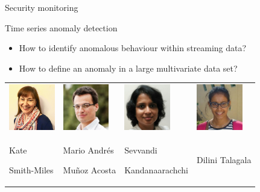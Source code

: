 \documentclass[14pt]{beamer}
\begin{document}
\begin{frame}{Security monitoring}


\vspace*{4.2cm}

\hspace*{5.3cm}


\end{frame}

\begin{frame}{Time series anomaly detection}

\begin{itemize}
\item
  How to identify anomalous behaviour within streaming data?
\item
  How to define an anomaly in a large multivariate data set?
\end{itemize}

\pause\vspace*{1.4cm}

\begin{block}{}
\fontsize{11}{11}\sf
\centering\begin{tabular}{p{2.3cm}p{2.3cm}p{2.3cm}p{2.3cm}}
\includegraphics[height=2cm]{figs/kate} &
\includegraphics[height=2cm]{figs/andres} &
\includegraphics[height=2cm]{figs/sevvandi} &
\includegraphics[height=2cm]{figs/dilini} \\
Kate\par Smith-Miles &
Mario Andrés\par Muñoz Acosta &
Sevvandi\par Kandanaarachchi & Dilini Talagala
\end{tabular}
\end{block}

\end{frame}
\end{document}
